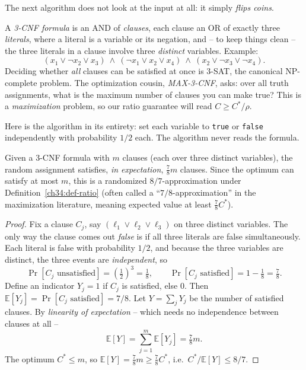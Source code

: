 The next algorithm does not look at the input at all: it simply
\emph{flips coins}.

A \emph{3-CNF formula} is an AND of \emph{clauses}, each clause an OR of
exactly three \emph{literals}, where a literal is a variable or its negation,
and -- to keep things clean -- the three literals in a clause involve three
\emph{distinct} variables. Example:
\[
(x_1 \lor \lnot x_2 \lor x_3)\ \land\
(\lnot x_1 \lor x_2 \lor x_4)\ \land\
(x_2 \lor \lnot x_3 \lor \lnot x_4).
\]
Deciding whether \emph{all} clauses can be satisfied at once is 3-SAT, the
canonical NP-complete problem. The optimization cousin, \emph{MAX-3-CNF},
asks: over all truth assignments, what is the maximum number of clauses you
can make true? This is a \emph{maximization} problem, so our ratio guarantee
will read $C \ge C^{*}/\rho$.

Here is the algorithm in its entirety: set each variable to \texttt{true} or
\texttt{false} independently with probability $1/2$ each. The algorithm never reads
the formula.

\begin{theorem}
\label{ch34:max3-thm}
Given a 3-CNF formula with $m$ clauses (each over three distinct variables),
the random assignment satisfies, \emph{in expectation}, $\tfrac{7}{8}m$
clauses. Since the optimum can satisfy at most $m$, this is a randomized
$8/7$-approximation under Definition~\ref{ch34:def-ratio} (often called a
``$7/8$-approximation'' in the maximization literature, meaning expected value
at least $\tfrac{7}{8}C^{*}$).
\end{theorem}

\begin{proof}
Fix a clause $C_j$, say $(\ell_1 \lor \ell_2 \lor \ell_3)$ on three distinct
variables. The only way the clause comes out \emph{false} is if all three
literals are false simultaneously. Each literal is false with probability
$1/2$, and because the three variables are distinct, the three events are
\emph{independent}, so
\[
\Pr[C_j \text{ unsatisfied}] = \left(\tfrac12\right)^3 = \tfrac18,
\qquad
\Pr[C_j \text{ satisfied}] = 1 - \tfrac18 = \tfrac78.
\]
Define an indicator $Y_j = 1$ if $C_j$ is satisfied, else $0$. Then
$\mathbb{E}[Y_j] = \Pr[C_j\text{ satisfied}] = 7/8$. Let $Y=\sum_j Y_j$ be the
number of satisfied clauses. By \emph{linearity of expectation} -- which needs
no independence between clauses at all --
\[
\mathbb{E}[Y] = \sum_{j=1}^{m} \mathbb{E}[Y_j] = \tfrac78 m.
\]
The optimum $C^{*}\le m$, so $\mathbb{E}[Y] = \tfrac78 m \ge \tfrac78 C^{*}$,
i.e.\ $C^{*}/\mathbb{E}[Y] \le 8/7$. \qedhere
\end{proof}

